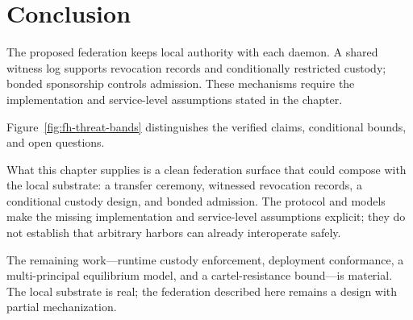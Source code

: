 \documentclass[11pt,a4paper]{article}
\theoremstyle{definition}
\theoremstyle{remark}
\begin{document}
\ifpdbook
\fi
\section{Conclusion}\label{sec:fh-conclusion}

The proposed federation keeps local authority with each daemon. A shared
witness log supports revocation records and conditionally restricted custody;
bonded sponsorship controls admission. These mechanisms require the
implementation and service-level assumptions stated in the chapter.

Figure~\ref{fig:fh-threat-bands} distinguishes the verified claims, conditional bounds, and open questions.

What this chapter supplies is a clean federation surface that could compose with the local substrate: a transfer ceremony, witnessed revocation records, a conditional custody design, and bonded admission. The protocol and models make the missing implementation and service-level assumptions explicit; they do not establish that arbitrary harbors can already interoperate safely.

The remaining work---runtime custody enforcement, deployment conformance, a multi-principal equilibrium model, and a cartel-resistance bound---is material. The local substrate is real; the federation described here remains a design with partial mechanization.
\end{document}
